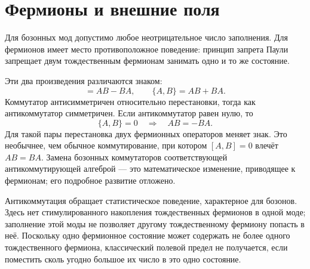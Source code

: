 \section{Фермионы и внешние поля}

Для бозонных мод допустимо любое неотрицательное число заполнения. Для фермионов имеет место противоположное поведение: принцип запрета Паули запрещает двум тождественным фермионам занимать одно и то же состояние.

\begin{classroomqa}
\end{classroomqa}

Эти два произведения различаются знаком:
\begin{equation}
[A,B]=AB-BA,
\qquad
\{A,B\}=AB+BA.
\end{equation}
Коммутатор антисимметричен относительно перестановки, тогда как антикоммутатор симметричен. Если антикоммутатор равен нулю, то
\begin{equation}
\{A,B\}=0
\quad\Longrightarrow\quad
AB=-BA.
\end{equation}
Для такой пары перестановка двух фермионных операторов меняет знак. Это необычнее, чем обычное коммутирование, при котором \([A,B]=0\) влечёт \(AB=BA\). Замена бозонных коммутаторов соответствующей антикоммутирующей алгеброй — это математическое изменение, приводящее к фермионам; его подробное развитие отложено.

Антикоммутация обращает статистическое поведение, характерное для бозонов. Здесь нет стимулированного накопления тождественных фермионов в одной моде; заполнение этой моды не позволяет другому тождественному фермиону попасть в неё. Поскольку одно фермионное состояние может содержать не более одного тождественного фермиона, классический полевой предел не получается, если поместить сколь угодно большое их число в это одно состояние.

\begin{classroomqa}
\end{classroomqa}

